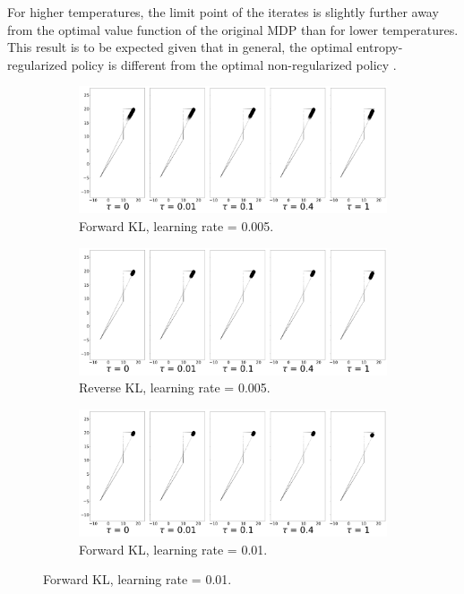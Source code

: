 \documentclass[twoside,11pt]{article}
\begin{document}
For higher temperatures, the limit point of the iterates is slightly further away from the optimal value function of the original MDP than for lower temperatures. This result is to be expected given that in general, the optimal entropy-regularized policy is different from the optimal non-regularized policy \citep{geist2019theory}.

\begin{figure}[!htb]
  \centering
  \begin{subfigure}[b]{0.85\linewidth}
    \centering
    \includegraphics[width=0.8\columnwidth]{figs/switch-stay/notlearnQ/polytope_forward_optim=rmsprop_lr=[0.005].png}
    \caption{Forward KL, learning rate = 0.005.}
    \label{fig:discrete-switch-stay-forward-adam0.005}
  \end{subfigure}
  
  \begin{subfigure}[b]{0.85\linewidth}
        \centering
        \includegraphics[width=0.8\columnwidth]{figs/switch-stay/notlearnQ/polytope_reverse_optim=rmsprop_lr=[0.005].png}
        \caption{Reverse KL, learning rate = 0.005.}
        \label{fig:discrete-switch-stay-reverse-adam0.005}
  \end{subfigure}
  
  \begin{subfigure}[b]{0.85\linewidth}
    \centering
    \includegraphics[width=0.8\columnwidth]{figs/switch-stay/notlearnQ/polytope_forward_optim=rmsprop_lr=[0.01].png}
    \caption{Forward KL, learning rate = 0.01.}
    \label{fig:discrete-switch-stay-forward-adam0.01}
  \end{subfigure}
  

\end{figure}
\end{document}
